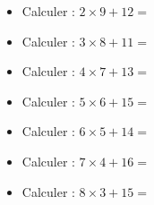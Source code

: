 \begin{multicols}{3}
\begin{itemize}[label={$\bullet$}]
  \item Calculer :  $ 2 \times 9 + 12 = $ \dotfill \\
  \item Calculer :  $ 3 \times 8 + 11 = $ \dotfill \\
  \item Calculer :  $ 4 \times 7 + 13 = $ \dotfill \\
  \item Calculer :  $ 5 \times 6 + 15 = $ \dotfill \\
  \item Calculer :  $ 6 \times 5 + 14 = $ \dotfill \\
  \item Calculer :  $ 7 \times 4 + 16 = $ \dotfill \\
  \item Calculer :  $ 8 \times 3+  15 = $ \dotfill \\ 
\end{itemize}

\end{multicols}


